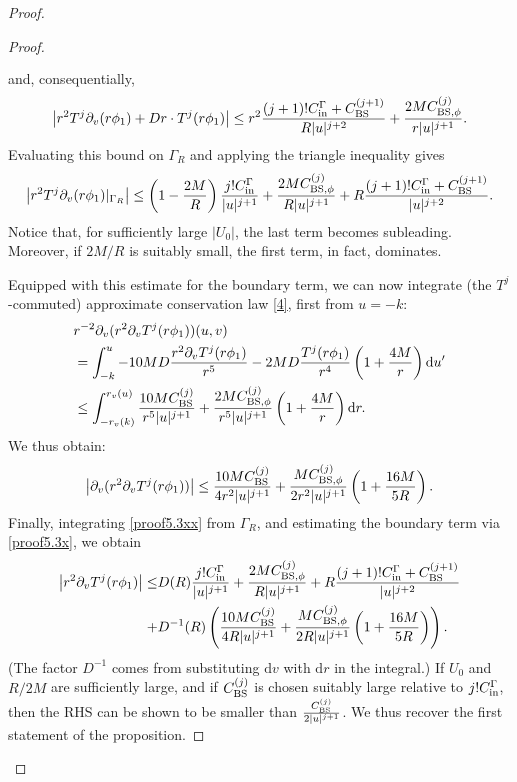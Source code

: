 \documentclass[11pt,english]{article}
\numberwithin{equation}{section}
\theoremstyle{remark}
\theoremstyle{plain}
\theoremstyle{remark}
\newcommand{\dd}{\mathop{}\!\mathrm{d}}
\newcommand{\pv}{\partial_v}
\renewcommand{\(}{\left(}
\renewcommand{\)}{\right)}
\newcommand{\pho}{(r\phi_1)}
\begin{document}
\begin{proof}
\begin{proof}
\begin{align*}
\begin{split}
\end{split}
\end{align*}
and, consequentially,
\begin{align*}
\left|r^2T^j\pv\pho+Dr\cdot T^j(r\phi_1)\right|\leq r^2\frac{(j+1)!\cin+\cbs^{(j+1)}}{R|u|^{j+2}}+\frac{2M\cbsp^{(j)}}{r|u|^{j+1}}.
\end{align*}
Evaluating this bound on $\Gamma_R$ and applying the triangle inequality gives
\begin{equation}\label{proof5.3x}
\left|r^2T^j\pv\pho|_{\Gamma_R}\right|\leq \left(1-\frac{2M}{R}\right)\frac{j!\cin}{|u|^{j+1}}+\frac{2M\cbsp^{(j)}}{R|u|^{j+1}}+R\frac{(j+1)!\cin+\cbs^{(j+1)}}{|u|^{j+2}}.
\end{equation}
Notice that, for sufficiently large $|U_0|$, the last term becomes subleading. Moreover, if $2M/R$ is suitably small, the first term, in fact, dominates.

 Equipped with this estimate for the boundary term, we can now integrate (the $T^j$-commuted) approximate conservation law \eqref{4}, first from $u=-k$:
\begin{align*}
&r^{-2}\pv(r^2\pv T^j\pho)(u,v)\\
&=\int_{-k}^u -10 MD\frac{r^2\pv T^j(r\phi_1)}{r^5}-2MD\frac{T^j(r\phi_1)}{r^4}\left(1+\frac{4M}{r}\right)\dd u' \\
&\leq \int_{-r_v(k)}^{r_v(u)} \frac{10M\cbs^{(j)}}{r^5|u|^{j+1}}+\frac{2M\cbsp^{(j)}}{r^5|u|^{j+1}}\left(1+\frac{4M}{r}\right)\dd r.
\end{align*}
We thus obtain:
\begin{equation}\label{proof5.3xx}
\left|\pv(r^2\pv T^j\pho)\right| \leq \frac{10M\cbs^{(j)}}{4r^2|u|^{j+1}}+\frac{M\cbsp^{(j)}}{2r^2|u|^{j+1}}\left(1+\frac{16M}{5R}\right).
\end{equation}
Finally, integrating \eqref{proof5.3xx} from $\Gamma_R$, and estimating the boundary term via \eqref{proof5.3x}, we obtain
\begin{align}\label{proof5.3xxx}
\begin{split}
\left|r^2\pv T^j\pho\right|\leq& D(R)\frac{j!\cin}{|u|^{j+1}}+\frac{2M\cbsp^{(j)}}{R|u|^{j+1}}+R\frac{(j+1)!\cin+\cbs^{(j+1)}}{|u|^{j+2}}\\
+&D^{-1}(R)\left(\frac{10M\cbs^{(j)}}{4R|u|^{j+1}}+\frac{M\cbsp^{(j)}}{2R|u|^{j+1}}\left(1+\frac{16M}{5R}\right)\right).
\end{split}
\end{align}
(The factor $D^{-1}$ comes from substituting $\mathrm{d}v$ with $\mathrm{d}r$ in the integral.) If $U_0$ and $R/2M$ are sufficiently large, and if $C_{\mathrm{BS}}^{(j)}$ is chosen suitably large relative to $j!C_{\mathrm{in}}^\Gamma$, then  the RHS can be shown to be smaller than $\frac{C_{\mathrm{BS}}^{(j)}}{2|u|^{j+1}}$. We thus recover the first statement of the proposition. 


\end{proof}
\end{proof}
\end{document}
